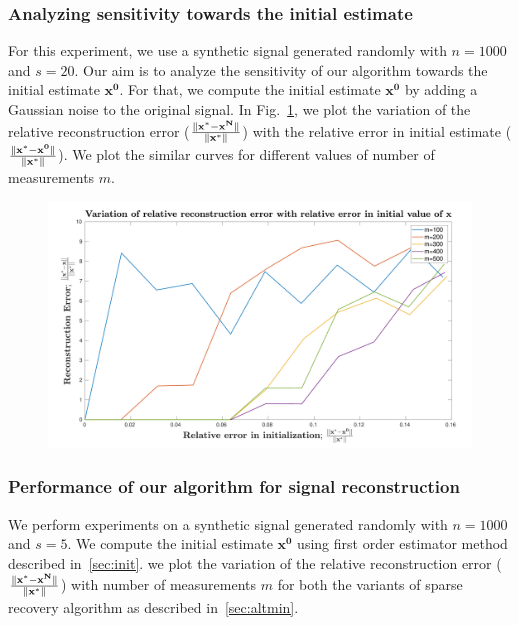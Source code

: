 \subsubsection{Analyzing sensitivity towards the initial estimate}
For this experiment, we use a synthetic signal generated randomly with $n=1000$ and $s=20$. 
Our aim is to analyze the sensitivity of our algorithm towards the initial estimate $\mathbf{x^0}$. %
For that, we compute the initial estimate $\mathbf{x^0}$ by adding a Gaussian noise to the original signal. In Fig.~\ref{fig:pl}, we plot the variation of the relative reconstruction error ($\frac{\|\mathbf{x^*-x^N}\|}{\|\mathbf{x^*}\|}$) with the relative error in initial estimate ($\frac{\|\mathbf{x^*-x^0}\|}{\|\mathbf{x^*}\|}$). We plot the similar curves for different values of number of measurements $m$.
\begin{figure}[t]
	\begin{center}
		\includegraphics[width=\linewidth]{./fig/graph.pdf}
	\end{center}
	\caption{}
	\label{fig:pl}
\end{figure}


\subsubsection{Performance of our algorithm for signal reconstruction}
We perform experiments on a synthetic signal generated randomly with $n=1000$ and $s=5$. We compute the initial estimate $\mathbf{x^0}$ using first order estimator method described in~\ref{sec:init}. we plot the variation of the relative reconstruction error ($\frac{\|\mathbf{x^*-x^N}\|}{\|\mathbf{x^*}\|}$) with number of measurements $m$ for both the variants of sparse recovery algorithm as described in~\ref{sec:altmin}.

